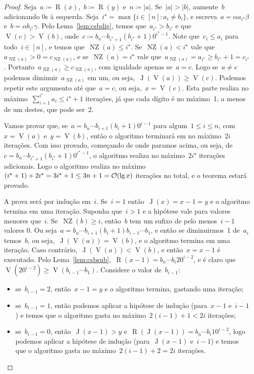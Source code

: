 \documentclass[main.tex]{subfiles}
\newcommand{\NZ}{\operatorname{NZ}}
\renewcommand{\V}{\operatorname{V}}
\newcommand{\R}{\operatorname{R}}
\newcommand{\J}{\operatorname{J}}
\begin{document}
\begin{proof}
	Seja~$a \coloneqq \R(x)$,~$b \coloneqq \R(y)$ e~$n \coloneqq |a|$. Se~$|a| > |b|$, aumente~$b$ adicionando 0s à esquerda. Seja~${i^\star = \max\{i \in [n] : a_i \neq b_i\}}$, e escreva~${a = \alpha a_{i^\star} \beta}$ e~${b = \alpha b_{i^\star} \gamma}$. Pelo Lema~\ref{lem:csbdig}, temos que~$a_{i^\star} > b_{i^\star}$ e que~${\V(c) > \V(b)}$, onde~${c \coloneqq b_n \cdots b_{i^\star + 1} (b_{i^\star} + 1) 0^{i^\star - 1}}$. Note que~$c_i \leq a_i$ para todo~${i \in [n]}$, e temos que~$\NZ(a) \leq i^\star$. Se~$\NZ(a) < i^\star$ vale que~$a_{\NZ(a)} > 0 = c_{\NZ(a)}$, e se~$\NZ(a) = i^\star$ vale que~${a_{\NZ(a)} = a_{i^\star} \geq b_{i^\star} + 1 = c_{i^\star}}$. Portanto~$a_{\NZ(a)} \geq c_{\NZ(a)}$, com igualdade apenas se~$a = c$. Logo se~$a \neq c$ podemos diminuir~$a_{\NZ(a)}$ em um, ou seja,~$\J(\V(a)) \geq \V(c)$. Podemos repetir este argumento até que~$a = c$, ou seja,~$x = \V(c)$. Esta parte realiza no máximo~${\sum\limits_{i = 1}^{i^\star}{a_i} \leq i^\star + 1}$ iterações, já que cada dígito é no máximo~1, a menos de um destes, que pode ser~2.

	Vamos provar que, se~${a = b_n \cdots b_{i+1} (b_i + 1) 0^{i-1}}$ para algum~$1 \leq i \leq n$, com~$x = \V(a)$ e~$y = \V(b)$, então o algoritmo terminará em no máximo~$2i$ iterações. Com isso provado, começando de onde paramos acima, ou seja, de~${c = b_n \cdots b_{i^\star + 1} (b_{i^\star} + 1) 0^{i^\star - 1}}$, o algoritmo realiza no máximo~$2i^\star$ iterações adicionais. Logo o algoritmo realiza no máximo~${(i^\star + 1) + 2i^\star = 3i^\star + 1 \leq 3n+1 = \mathcal{O}(\lg x)}$ iterações no total, e o teorema estará provado.

	A prova será por indução em~$i$. Se~$i = 1$ então~${\J(x) = x - 1 = y}$ e o algoritmo termina em uma iteração.
	Suponha que~$i > 1$ e a hipótese vale para valores menores que~$i$. Se~${\NZ(b) \geq i}$, então~$b$ tem um sufixo de pelo menos~$i - 1$ valores 0. Ou seja~${a = b_n \cdots b_{i + 1} (b_{i} + 1) b_{i - 1} \cdots b_1}$, e então se diminuirmos~1 de~$a_{i}$ temos~$b$, ou seja,~${\J(\V(a)) = \V(b)}$, e o algoritmo termina em uma iteração.
	Caso contrário,~$\J(\V(a)) < \V(b)$, e então~$x = x - 1$ é executado. Pelo Lema~\ref{lem:csbsub},~${\R(x - 1) = b_n \cdots b_i 2 0^{i-2}}$, e é claro que~${\V(20^{i-2}) \geq \V(b_{i-1} \cdots b_1)}$. Considere o valor de~$b_{i-1}$:
	\begin{itemize}
		\item se~$b_{i-1} = 2$, então~$x - 1 = y$ e o algoritmo termina, gastando uma iteração;
		\item se~$b_{i-1} = 1$, então podemos aplicar a hipótese de indução (para~$x - 1$ e~$i - 1$) e temos que o algoritmo gasta no máximo~$2(i - 1) + 1 < 2i$ iterações;
		\item se~$b_{i-1} = 0$, então~$\J(x - 1) > y$ e~$\R(\J(x - 1)) = b_n \cdots b_i 1 0^{i-2}$, logo podemos aplicar a hipótese de indução (para~$\J(x-1)$ e~$i-1$) e temos que o algoritmo gasta no máximo~$2(i-1) + 2 = 2i$ iterações.
	\end{itemize}
\end{proof}
\end{document}
